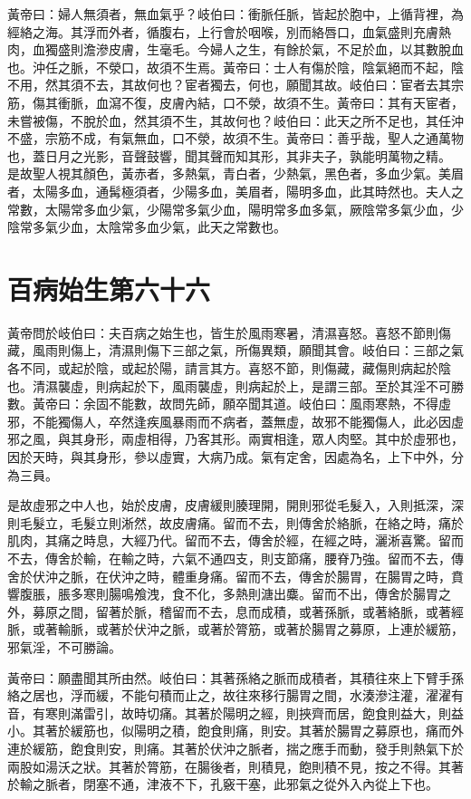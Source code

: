 黃帝曰：婦人無須者，無血氣乎？岐伯曰：衝脈任脈，皆起於胞中，上循背裡，為經絡之海。其浮而外者，循腹右，上行會於咽喉，別而絡唇口，血氣盛則充膚熱肉，血獨盛則澹滲皮膚，生毫毛。今婦人之生，有餘於氣，不足於血，以其數脫血也。沖任之脈，不滎口，故須不生焉。黃帝曰：士人有傷於陰，陰氣絕而不起，陰不用，然其須不去，其故何也？宦者獨去，何也，願聞其故。岐伯曰：宦者去其宗筋，傷其衝脈，血瀉不復，皮膚內結，口不滎，故須不生。黃帝曰：其有天宦者，未嘗被傷，不脫於血，然其須不生，其故何也？岐伯曰：此天之所不足也，其任沖不盛，宗筋不成，有氣無血，口不滎，故須不生。黃帝曰：善乎哉，聖人之通萬物也，蓋日月之光影，音聲鼓響，聞其聲而知其形，其非夫子，孰能明萬物之精。
是故聖人視其顏色，黃赤者，多熱氣，青白者，少熱氣，黑色者，多血少氣。美眉者，太陽多血，通髯極須者，少陽多血，美眉者，陽明多血，此其時然也。夫人之常數，太陽常多血少氣，少陽常多氣少血，陽明常多血多氣，厥陰常多氣少血，少陰常多氣少血，太陰常多血少氣，此天之常數也。


\section{百病始生第六十六}

黃帝問於岐伯曰：夫百病之始生也，皆生於風雨寒暑，清濕喜怒。喜怒不節則傷藏，風雨則傷上，清濕則傷下三部之氣，所傷異類，願聞其會。岐伯曰：三部之氣各不同，或起於陰，或起於陽，請言其方。喜怒不節，則傷藏，藏傷則病起於陰也。清濕襲虛，則病起於下，風雨襲虛，則病起於上，是謂三部。至於其淫不可勝數。黃帝曰：余固不能數，故問先師，願卒聞其道。岐伯曰：風雨寒熱，不得虛邪，不能獨傷人，卒然逢疾風暴雨而不病者，蓋無虛，故邪不能獨傷人，此必因虛邪之風，與其身形，兩虛相得，乃客其形。兩實相逢，眾人肉堅。其中於虛邪也，因於天時，與其身形，參以虛實，大病乃成。氣有定舍，因處為名，上下中外，分為三員。

是故虛邪之中人也，始於皮膚，皮膚緩則腠理開，開則邪從毛髮入，入則抵深，深則毛髮立，毛髮立則淅然，故皮膚痛。留而不去，則傳舍於絡脈，在絡之時，痛於肌肉，其痛之時息，大經乃代。留而不去，傳舍於經，在經之時，灑淅喜驚。留而不去，傳舍於輸，在輸之時，六氣不通四支，則支節痛，腰脊乃強。留而不去，傳舍於伏沖之脈，在伏沖之時，體重身痛。留而不去，傳舍於腸胃，在腸胃之時，賁響腹脹，脹多寒則腸鳴飧洩，食不化，多熱則溏出麋。留而不出，傳舍於腸胃之外，募原之間，留著於脈，稽留而不去，息而成積，或著孫脈，或著絡脈，或著經脈，或著輸脈，或著於伏沖之脈，或著於膂筋，或著於腸胃之募原，上連於緩筋，邪氣淫，不可勝論。

黃帝曰：願盡聞其所由然。岐伯曰：其著孫絡之脈而成積者，其積往來上下臂手孫絡之居也，浮而緩，不能句積而止之，故往來移行腸胃之間，水湊滲注灌，濯濯有音，有寒則滿雷引，故時切痛。其著於陽明之經，則挾齊而居，飽食則益大，則益小。其著於緩筋也，似陽明之積，飽食則痛，則安。其著於腸胃之募原也，痛而外連於緩筋，飽食則安，則痛。其著於伏沖之脈者，揣之應手而動，發手則熱氣下於兩股如湯沃之狀。其著於膂筋，在腸後者，則積見，飽則積不見，按之不得。其著於輸之脈者，閉塞不通，津液不下，孔竅干塞，此邪氣之從外入內從上下也。

